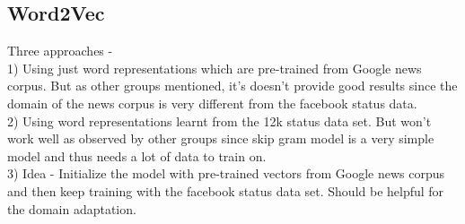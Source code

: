 \subsection{Word2Vec}

Three approaches - \\ 
1) Using just word representations which are pre-trained from Google news corpus. But as other groups mentioned, it's doesn't provide good results since the domain of the news corpus is very different from the facebook status data. \\
2) Using word representations learnt from the 12k status data set. But won't work well as observed by other groups since skip gram model is a very simple model and thus needs a lot of data to train on. \\
3) Idea - Initialize the model with pre-trained vectors from Google news corpus and then keep training with the facebook status data set. Should be helpful for the domain adaptation.